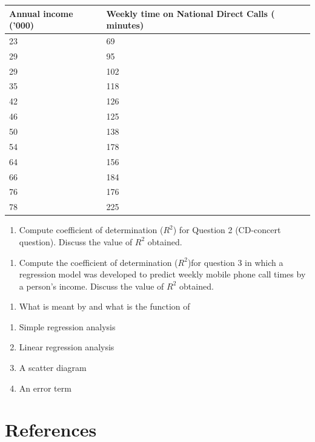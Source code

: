 \documentclass[]{book}
\providecommand{\tightlist}{%
  \setlength{\itemsep}{0pt}\setlength{\parskip}{0pt}}
\begin{document}
\begin{longtable}[]{@{}ll@{}}
\toprule
Annual income ('000) & Weekly time on National Direct Calls ( minutes)\tabularnewline
\midrule
\endhead
23 & 69\tabularnewline
29 & 95\tabularnewline
29 & 102\tabularnewline
35 & 118\tabularnewline
42 & 126\tabularnewline
46 & 125\tabularnewline
50 & 138\tabularnewline
54 & 178\tabularnewline
64 & 156\tabularnewline
66 & 184\tabularnewline
76 & 176\tabularnewline
78 & 225\tabularnewline
\bottomrule
\end{longtable}

\begin{enumerate}
\def\labelenumi{\arabic{enumi}.}
\setcounter{enumi}{3}
\tightlist
\item
  Compute coefficient of determination (\(R^2\)) for Question 2 (CD-concert question). Discuss the value of \(R^2\) obtained.
\end{enumerate}

\begin{enumerate}
\def\labelenumi{\arabic{enumi}.}
\setcounter{enumi}{4}
\tightlist
\item
  Compute the coefficient of determination (\(R^2\))for question 3 in which a regression model was developed to predict weekly mobile phone call times by a person's income. Discuss the value of \(R^2\) obtained.
\end{enumerate}

\begin{enumerate}
\def\labelenumi{\arabic{enumi}.}
\setcounter{enumi}{5}
\tightlist
\item
  What is meant by and what is the function of
\end{enumerate}

\begin{enumerate}
\def\labelenumi{\alph{enumi})}
\tightlist
\item
  Simple regression analysis
\item
  Linear regression analysis
\item
  A scatter diagram
\item
  An error term
\end{enumerate}

\newpage

\hypertarget{references-9}{%
\chapter*{References}\label{references-9}}
\end{document}

